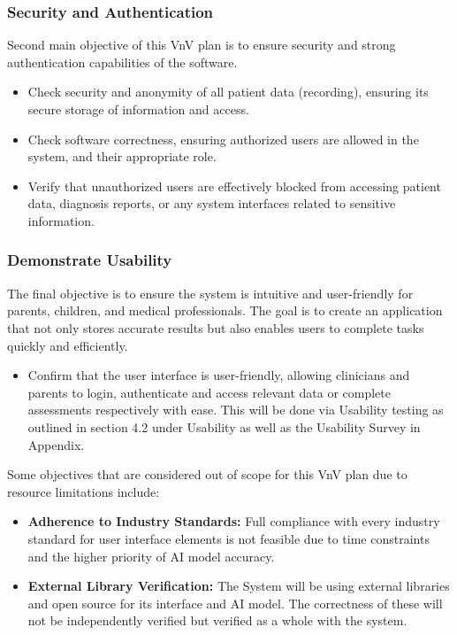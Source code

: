\documentclass[12pt, titlepage]{article}
\begin{document}
\subsubsection{Security and Authentication}

Second main objective of this VnV plan is to ensure security and strong authentication capabilities of the software. 
\begin{itemize}
  \item Check security and anonymity of all patient data (recording), ensuring its secure storage of information and access.
  \item Check software correctness, ensuring authorized users are allowed in the system, and their appropriate role. 
  \item Verify that unauthorized users are effectively blocked from accessing 
  patient data, diagnosis reports, or any system interfaces related to sensitive information.
\end{itemize}

\subsubsection{Demonstrate Usability}
The final objective is to ensure the system is intuitive and user-friendly for parents, children, and medical professionals. 
The goal is to create an application that not only stores accurate results but also enables 
users to complete tasks quickly and efficiently.

\begin{itemize}
  \item Confirm that the user interface is user-friendly, allowing clinicians and parents to login, authenticate 
  and access relevant data or complete assessments respectively with ease. This will be done via Usability testing as outlined
  in section 4.2 under Usability as well as the Usability Survey in Appendix.   
\end{itemize}


Some objectives that are considered out of scope for this VnV plan due to resource limitations include:

\begin{itemize}
  \item \textbf{Adherence to Industry Standards: } Full compliance with every industry standard for user interface elements is not feasible due to time 
  constraints and the higher priority of AI model accuracy.
  \item \textbf{External Library Verification: } The System will be using external libraries and 
  open source  for its interface and AI model. The correctness of these will not be independently verified but verified as a whole with the system. 
\end{itemize}
\end{document}
